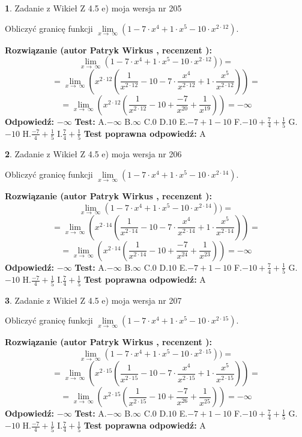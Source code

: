\documentclass[12pt, a4paper]{article}
\theoremstyle{definition} %
\newtheorem{zad}{}
\newcommand{\zadStart}[1]{\begin{zad}#1\newline}
\newcommand{\zadStop}{\end{zad}}
\newcommand{\rozwStart}[2]{\noindent \textbf{Rozwiązanie (autor #1 , recenzent #2): }\newline}
\newcommand{\rozwStop}{\newline}
\newcommand{\odpStart}{\noindent \textbf{Odpowiedź:}\newline}
\newcommand{\odpStop}{\newline}
\newcommand{\testStart}{\noindent \textbf{Test:}\newline}
\newcommand{\testStop}{\newline}
\newcommand{\kluczStart}{\noindent \textbf{Test poprawna odpowiedź:}\newline}
\newcommand{\kluczStop}{\newline}
\begin{document}
\zadStart{Zadanie z Wikieł Z 4.5 e) moja wersja nr 205}



Obliczyć granicę funkcji  $\lim\limits_{x\to\ \infty}(1 - 7 \cdot x^{4}+1 \cdot x^{5}- 10 \cdot x^{2\cdot12})$.
\zadStop
\rozwStart{Patryk Wirkus}{}
$$\lim\limits_{x\to\ \infty}(1 - 7 \cdot x^{4}+1 \cdot x^{5}- 10 \cdot x^{2\cdot12}))=$$
$$=\lim\limits_{x\to\ \infty}(x^{2\cdot12}(\frac{1}{x^{2\cdot12}}-10 -7 \cdot \frac{x^{4}}{x^{2\cdot12}}+1 \cdot \frac{x^{5}}{x^{2\cdot12}}))=$$
$$=\lim\limits_{x\to\ \infty}(x^{2\cdot12}(\frac{1}{x^{2\cdot12}}-10 + \frac{-7}{x^{20}}+ \frac{1}{x^{19}}))=-\infty$$
\rozwStop
\odpStart
$-\infty$
\odpStop
\testStart
A.$-\infty$ B.$\infty$ C.$0$ D.$10$ E.$-7 + 1 - 10$
F.$-10+\frac{7}{4}+\frac{1}{5}$ G.$-10$
H.$\frac{-7}{4}+\frac{1}{5}$
I.$\frac{7}{4}+\frac{1}{5}$
\testStop
\kluczStart
A
\kluczStop



\zadStart{Zadanie z Wikieł Z 4.5 e) moja wersja nr 206}



Obliczyć granicę funkcji  $\lim\limits_{x\to\ \infty}(1 - 7 \cdot x^{4}+1 \cdot x^{5}- 10 \cdot x^{2\cdot14})$.
\zadStop
\rozwStart{Patryk Wirkus}{}
$$\lim\limits_{x\to\ \infty}(1 - 7 \cdot x^{4}+1 \cdot x^{5}- 10 \cdot x^{2\cdot14}))=$$
$$=\lim\limits_{x\to\ \infty}(x^{2\cdot14}(\frac{1}{x^{2\cdot14}}-10 -7 \cdot \frac{x^{4}}{x^{2\cdot14}}+1 \cdot \frac{x^{5}}{x^{2\cdot14}}))=$$
$$=\lim\limits_{x\to\ \infty}(x^{2\cdot14}(\frac{1}{x^{2\cdot14}}-10 + \frac{-7}{x^{24}}+ \frac{1}{x^{23}}))=-\infty$$
\rozwStop
\odpStart
$-\infty$
\odpStop
\testStart
A.$-\infty$ B.$\infty$ C.$0$ D.$10$ E.$-7 + 1 - 10$
F.$-10+\frac{7}{4}+\frac{1}{5}$ G.$-10$
H.$\frac{-7}{4}+\frac{1}{5}$
I.$\frac{7}{4}+\frac{1}{5}$
\testStop
\kluczStart
A
\kluczStop



\zadStart{Zadanie z Wikieł Z 4.5 e) moja wersja nr 207}



Obliczyć granicę funkcji  $\lim\limits_{x\to\ \infty}(1 - 7 \cdot x^{4}+1 \cdot x^{5}- 10 \cdot x^{2\cdot15})$.
\zadStop
\rozwStart{Patryk Wirkus}{}
$$\lim\limits_{x\to\ \infty}(1 - 7 \cdot x^{4}+1 \cdot x^{5}- 10 \cdot x^{2\cdot15}))=$$
$$=\lim\limits_{x\to\ \infty}(x^{2\cdot15}(\frac{1}{x^{2\cdot15}}-10 -7 \cdot \frac{x^{4}}{x^{2\cdot15}}+1 \cdot \frac{x^{5}}{x^{2\cdot15}}))=$$
$$=\lim\limits_{x\to\ \infty}(x^{2\cdot15}(\frac{1}{x^{2\cdot15}}-10 + \frac{-7}{x^{26}}+ \frac{1}{x^{25}}))=-\infty$$
\rozwStop
\odpStart
$-\infty$
\odpStop
\testStart
A.$-\infty$ B.$\infty$ C.$0$ D.$10$ E.$-7 + 1 - 10$
F.$-10+\frac{7}{4}+\frac{1}{5}$ G.$-10$
H.$\frac{-7}{4}+\frac{1}{5}$
I.$\frac{7}{4}+\frac{1}{5}$
\testStop
\kluczStart
A
\kluczStop
\end{document}
